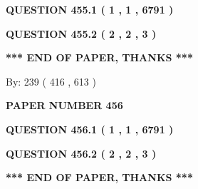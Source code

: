 \documentclass[12pt]{article}
\begin{document}
\vspace{0.2in}
  
{\textbf{\Large{QUESTION
455.1 
 ( 1 , 1 , 6791 )
}}}
  
  
  
\vspace{0.2in}
  
{\textbf{\Large{QUESTION
455.2 
 ( 2 , 2 , 3 )
}}}
  
  
   
   
 \vspace{0.2in}
 
   
   
   
   
\vspace{1.0in} 
{\textbf{\large{ *** END OF PAPER, THANKS *** }}} 
   
   
\hspace{1.0in} By: 
 239 ( 416 ,  613 )
   
   
   
   
\newpage 
\setcounter{page}{ 
   456001 } 
   
   
   
   
 {\textbf{ \Large{ PAPER NUMBER  456  }}}
   
   
\vspace{0.2in}
   
   
   
   
   
   
 \vspace{0.2in}
 
 
 
 
   
   
  
\vspace{0.2in}
  
{\textbf{\Large{QUESTION
456.1 
 ( 1 , 1 , 6791 )
}}}
  
  
  
\vspace{0.2in}
  
{\textbf{\Large{QUESTION
456.2 
 ( 2 , 2 , 3 )
}}}
  
  
   
   
 \vspace{0.2in}
 
   
   
   
   
\vspace{1.0in} 
{\textbf{\large{ *** END OF PAPER, THANKS *** }}} 
   
\end{document}
